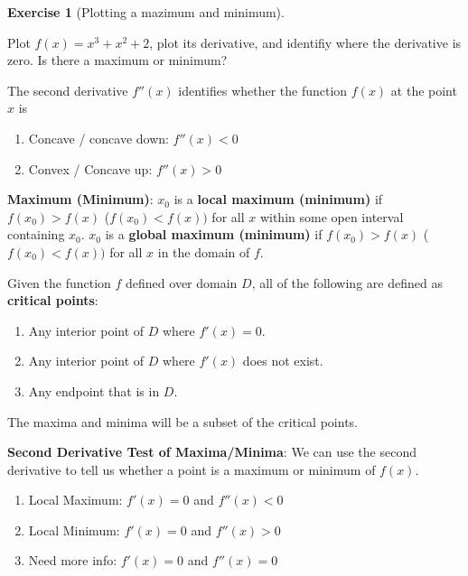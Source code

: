 \documentclass[
  letterpaper,
]{book}
\providecommand{\tightlist}{%
  \setlength{\itemsep}{0pt}\setlength{\parskip}{0pt}}\usepackage{longtable,booktabs,array}
\theoremstyle{definition}
\theoremstyle{definition}
\theoremstyle{plain}
\theoremstyle{definition}
\newtheorem{exercise}{Exercise}[chapter]
\theoremstyle{plain}
\theoremstyle{plain}
\theoremstyle{remark}
\begin{document}
\leavevmode{}%
\begin{exercise}[Plotting a mazimum and minimum]\label{exr-}

Plot \(f(x)=x^3+ x^2 + 2\), plot its derivative, and identifiy where the
derivative is zero. Is there a maximum or minimum?

\end{exercise}

The second derivative \(f''(x)\) identifies whether the function
\(f(x)\) at the point \(x\) is

\begin{enumerate}
\def\labelenumi{\arabic{enumi}.}
\tightlist
\item
  Concave / concave down: \(f''(x)<0\)
\item
  Convex / Concave up: \(f''(x)>0\)
\end{enumerate}

\textbf{Maximum (Minimum)}: \(x_0\) is a \textbf{local maximum
(minimum)} if \(f(x_0)>f(x)\) (\(f(x_0)<f(x))\) for all \(x\) within
some open interval containing \(x_0\). \(x_0\) is a \textbf{global
maximum (minimum)} if \(f(x_0)>f(x)\) (\(f(x_0)<f(x))\) for all \(x\) in
the domain of \(f\).

Given the function \(f\) defined over domain \(D\), all of the following
are defined as \textbf{critical points}:

\begin{enumerate}
\def\labelenumi{\arabic{enumi}.}
\tightlist
\item
  Any interior point of \(D\) where \(f'(x)=0\).
\item
  Any interior point of \(D\) where \(f'(x)\) does not exist.
\item
  Any endpoint that is in \(D\).
\end{enumerate}

The maxima and minima will be a subset of the critical points.

\textbf{Second Derivative Test of Maxima/Minima}: We can use the second
derivative to tell us whether a point is a maximum or minimum of
\(f(x)\).

\begin{enumerate}
\def\labelenumi{\arabic{enumi}.}
\tightlist
\item
  Local Maximum: \(f'(x)=0\) and \(f''(x)<0\)
\item
  Local Minimum: \(f'(x)=0\) and \(f''(x)>0\)
\item
  Need more info: \(f'(x)=0\) and \(f''(x)=0\)
\end{enumerate}
\end{document}
